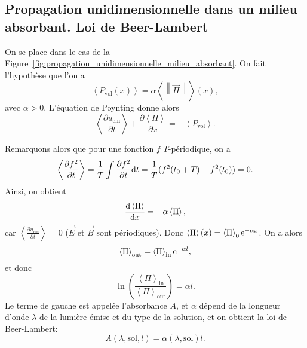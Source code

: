 \subsection{Propagation unidimensionnelle dans un milieu absorbant. Loi de Beer-Lambert}

On se place dans le cas de la Figure~\ref{fig:propagation_unidimensionnelle_milieu_absorbant}. On fait l'hypothèse que l'on a
\begin{equation}
    \left\langle P_{\mathrm{vol}}(x)\right\rangle=\alpha\left\langle\left\lVert\vec{\Pi}\right\rVert\right\rangle(x),
\end{equation}
avec $\alpha>0$. L'équation de Poynting donne alors
\begin{equation}
    \left\langle\frac{\partial u_{\mathrm{em}}}{\partial t}\right\rangle+\frac{\partial\left\langle\Pi\right\rangle}{\partial x}=-\left\langle P_{\mathrm{vol}}\right\rangle.
\end{equation}

Remarquons alors que pour une fonction $f$ $T$-périodique, on a
\begin{equation}
    \left\langle\frac{\partial f^{2}}{\partial t}\right\rangle=\frac{1}{T}\int\frac{\partial f^{2}}{\partial t}\mathrm{d} t=\frac{1}{T}(f^{2}(t_0+T)-f^{2}(t_0))=0.
\end{equation}
Ainsi, on obtient
\begin{equation}
    \frac{\mathrm{d}\left\langle\Pi\right\rangle}{\mathrm{d} x}=-\alpha\left\langle\Pi\right\rangle,
\end{equation}
car $\left\langle\frac{\partial u_{\mathrm{em}}}{\partial t}\right\rangle=0$ ($\vec{E}$ et $\vec{B}$ sont périodiques). Donc $\left\langle \Pi\right\rangle(x)=\left\langle\Pi\right\rangle_{0}\mathrm{e}^{-\alpha x}$. On a alors 
\begin{equation}
    \left\langle\Pi\right\rangle_{\mathrm{out}}=\left\langle\Pi\right\rangle_{\mathrm{in}}\mathrm{e}^{-\alpha l},
\end{equation}
et donc 
\begin{equation}
    \ln\left(
        \frac{\left\langle\Pi\right\rangle_{\mathrm{in}}}{\left\langle\Pi\right\rangle_{\mathrm{out}}}
    \right)=\alpha l.
\end{equation}
Le terme de gauche est appelée l'absorbance $A$, et $\alpha$ dépend de la longueur d'onde $\lambda$ de la lumière émise et du type de la solution, et on obtient la loi de Beer-Lambert:
\begin{equation}
    \boxed{
        A(\lambda,\mathrm{sol},l)=\alpha(\lambda,\mathrm{sol})l.
    }
\end{equation}

